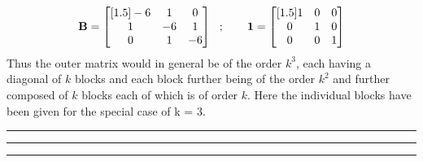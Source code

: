 \begin{align*}
{\bf B} = \begin{bmatrix}[1.5]
-6 & 1 & 0 \\
1 & -6 & 1 \\
0 & 1 & -6
\end{bmatrix} \ \ ; \ \ \ \ \ \ 
{\bf 1} 
=
\begin{bmatrix}[1.5]
1 & 0 & 0\\
0 & 1 & 0\\
0 & 0 & 1
\end{bmatrix}
\end{align*}
Thus the outer matrix would in general be of the order $k^3$, each having a diagonal of $k$ blocks and each block further being of the order  $k^2$ and further composed of $k$ blocks each of which is of order $k$. Here the individual blocks have been given for the special case of k = 3. \\ \hrule\hrule\hrule
